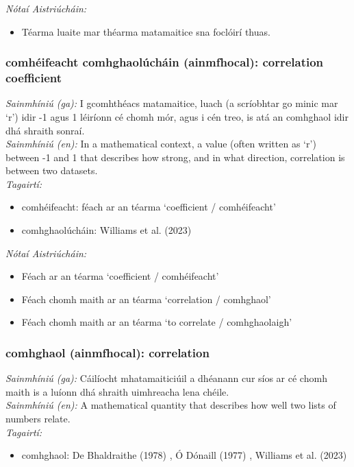  \noindent \textit{Nótaí Aistriúcháin:}
\begin{itemize}
	\item Téarma luaite mar théarma matamaitice sna foclóirí thuas.
\end{itemize}


\subsubsection*{comhéifeacht comhghaolúcháin (ainmfhocal): correlation coefficient}
 \noindent \textit{Sainmhíniú (ga):} I gcomhthéacs matamaitice, luach (a scríobhtar go minic mar `r') idir -1 agus 1 léiríonn cé chomh mór, agus i cén treo, is atá an comhghaol idir dhá shraith sonraí.
\\
 \noindent \textit{Sainmhíniú (en):} In a mathematical context, a value (often written as `r') between -1 and 1 that describes how strong, and in what direction, correlation is between two datasets.
\\
 \noindent \textit{Tagairtí:}
\begin{itemize}
	\item comhéifeacht: féach ar an téarma `coefficient / comhéifeacht'
	\item comhghaolúcháin: Williams et al. (2023) \cite{storchiste}
\end{itemize}

 \noindent \textit{Nótaí Aistriúcháin:}
\begin{itemize}
	\item Féach ar an téarma `coefficient / comhéifeacht'
	\item Féach chomh maith ar an téarma `correlation / comhghaol'
	\item Féach chomh maith ar an téarma `to correlate / comhghaolaigh'
\end{itemize}


\subsubsection*{comhghaol (ainmfhocal): correlation}
 \noindent \textit{Sainmhíniú (ga):} Cáilíocht mhatamaiticiúil a dhéanann cur síos ar cé chomh maith is a luíonn dhá shraith uimhreacha lena chéile.
\\
 \noindent \textit{Sainmhíniú (en):} A mathematical quantity that describes how well two lists of numbers relate.
\\
 \noindent \textit{Tagairtí:}
\begin{itemize}
	\item comhghaol: De Bhaldraithe (1978) \cite{de-bhaldraithe}, Ó Dónaill (1977) \cite{odonaill}, Williams et al. (2023) \cite{storchiste}
\end{itemize}

